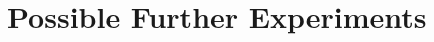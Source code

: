 \documentclass[conference]{IEEEtran}
\begin{document}
\section{Possible Further Experiments}



\end{document}
